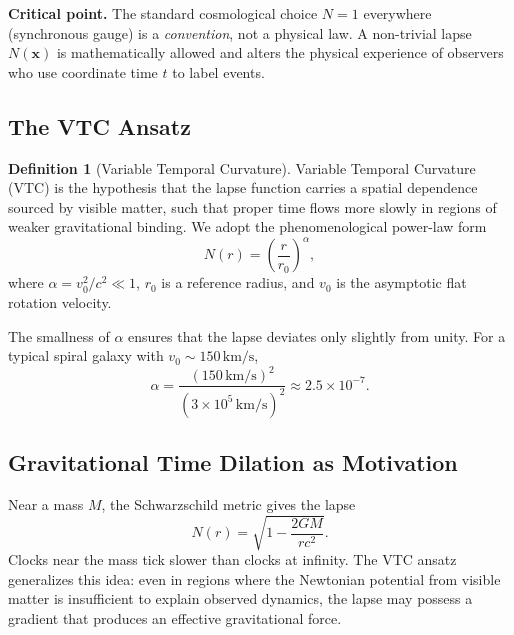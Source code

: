 \documentclass[11pt,a4paper]{article}
\theoremstyle{definition}
\newtheorem{definition}{Definition}[section]
\begin{document}
\textbf{Critical point.} The standard cosmological choice $N=1$ everywhere (synchronous gauge) is a \emph{convention}, not a physical law. A non-trivial lapse $N(\mathbf{x})$ is mathematically allowed and alters the physical experience of observers who use coordinate time $t$ to label events.

\subsection{The VTC Ansatz}

\begin{definition}[Variable Temporal Curvature]
Variable Temporal Curvature (VTC) is the hypothesis that the lapse function carries a spatial dependence sourced by visible matter, such that proper time flows more slowly in regions of weaker gravitational binding. We adopt the phenomenological power-law form
\begin{equation}
    \boxed{N(r) = \left(\frac{r}{r_0}\right)^{\alpha}},
    \label{eq:N_ansatz}
\end{equation}
where $\alpha = v_0^2/c^2 \ll 1$, $r_0$ is a reference radius, and $v_0$ is the asymptotic flat rotation velocity.
\end{definition}

The smallness of $\alpha$ ensures that the lapse deviates only slightly from unity. For a typical spiral galaxy with $v_0 \sim 150\,\mathrm{km/s}$,
\begin{equation}
    \alpha = \frac{(150\,\mathrm{km/s})^2}{(3\times10^5\,\mathrm{km/s})^2} \approx 2.5\times10^{-7}.
\end{equation}

\subsection{Gravitational Time Dilation as Motivation}

Near a mass $M$, the Schwarzschild metric gives the lapse
\begin{equation}
    N(r) = \sqrt{1 - \frac{2GM}{rc^2}}.
\end{equation}
Clocks near the mass tick slower than clocks at infinity. The VTC ansatz generalizes this idea: even in regions where the Newtonian potential from visible matter is insufficient to explain observed dynamics, the lapse may possess a gradient that produces an effective gravitational force.
\end{document}
